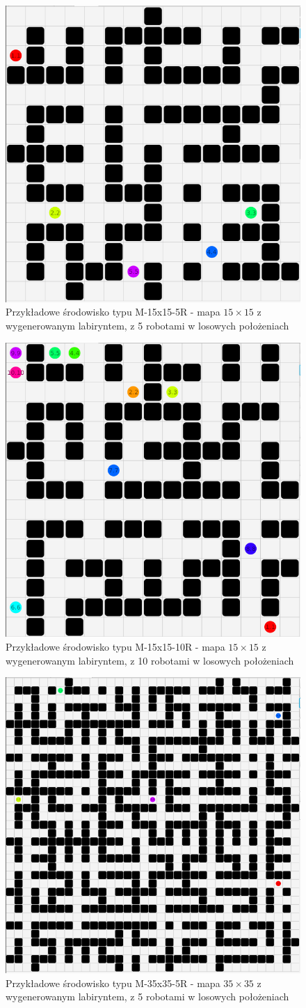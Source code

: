 \begin{figure}
	\centering
	\includegraphics[width=0.6\columnwidth]{img/robopath/tests-15-15-5}
	\caption{Przykładowe środowisko typu M-15x15-5R - mapa $15 \times 15$ z wygenerowanym labiryntem, z 5 robotami w losowych położeniach}
	\label{fig:test-env-15-15-5}
\end{figure}
\begin{figure}
	\centering
	\includegraphics[width=0.6\columnwidth]{img/robopath/tests-15-15-10}
	\caption{Przykładowe środowisko typu M-15x15-10R - mapa $15 \times 15$ z wygenerowanym labiryntem, z 10 robotami w losowych położeniach}
	\label{fig:test-env-15-15-10}
\end{figure}
\begin{figure}
	\centering
	\includegraphics[width=0.6\columnwidth]{img/robopath/tests-35-35-5}
	\caption{Przykładowe środowisko typu M-35x35-5R - mapa $35 \times 35$ z wygenerowanym labiryntem, z 5 robotami w losowych położeniach}
	\label{fig:test-env-35-35-5}
\end{figure}
